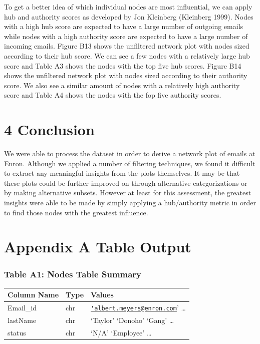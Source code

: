 \documentclass[]{article}
\begin{document}
To get a better idea of which individual nodes are most influential, we
can apply hub and authority scores as developed by Jon Kleinberg
(Kleinberg 1999). Nodes with a high hub score are expected to have a
large number of outgoing emails while nodes with a high authority score
are expected to have a large number of incoming emails. Figure B13 shows
the unfiltered network plot with nodes sized according to their hub
score. We can see a few nodes with a relatively large hub score and
Table A3 shows the nodes with the top five hub scores. Figure B14 shows
the unfiltered network plot with nodes sized according to their
authority score. We also see a similar amount of nodes with a relatively
high authority score and Table A4 shows the nodes with the fop five
authority scores.

\section{4 Conclusion}\label{conclusion}

We were able to process the dataset in order to derive a network plot of
emails at Enron. Although we applied a number of filtering techniques,
we found it difficult to extract any meaningful insights from the plots
themselves. It may be that these plots could be further improved on
through alternative categorizations or by making alternative subsets.
However at least for this assessment, the greatest insights were able to
be made by simply applying a hub/authority metric in order to find those
nodes with the greatest influence.

\newpage

\section{Appendix A Table Output}\label{appendix-a-table-output}

\subsubsection{Table A1: Nodes Table
Summary}\label{table-a1-nodes-table-summary}

\begin{longtable}[]{@{}lll@{}}
\toprule
Column Name & Type & Values\tabularnewline
\midrule
\endhead
Email\_id & chr &
\href{mailto:'albert.meyers@enron.com}{\nolinkurl{'albert.meyers@enron.com}}'
\ldots{}\tabularnewline
lastName & chr & `Taylor' `Donoho' `Gang' \ldots{}\tabularnewline
status & chr & `N/A' `Employee' \ldots{}\tabularnewline
\bottomrule
\end{longtable}
\end{document}
